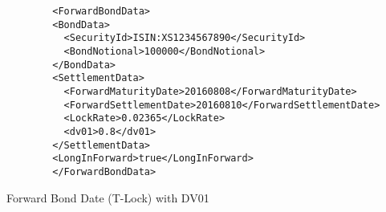 \begin{listing}[H]
	\begin{verbatim}
		<ForwardBondData>
		<BondData>
		  <SecurityId>ISIN:XS1234567890</SecurityId>
		  <BondNotional>100000</BondNotional>
		</BondData>
		<SettlementData>
		  <ForwardMaturityDate>20160808</ForwardMaturityDate>
		  <ForwardSettlementDate>20160810</ForwardSettlementDate>
		  <LockRate>0.02365</LockRate>
		  <dv01>0.8</dv01>
		</SettlementData>
		<LongInForward>true</LongInForward>
		</ForwardBondData>
	\end{verbatim}
	\caption{Forward Bond Date (T-Lock) with DV01}
	\label{lst:forward_bond_refdata_tlock_dv01}
\end{listing}
